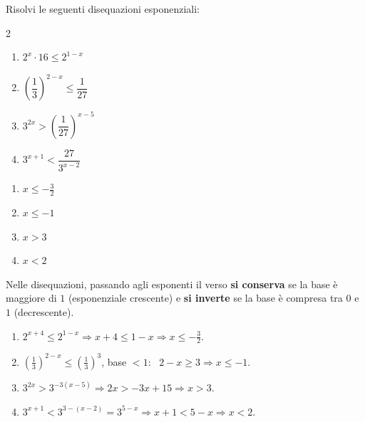 \begin{question}[ID=5.3, subtitle={Disequazioni con le proprietà delle potenze}, difficulty=media, tags={disequazioni, esponenziali, proprietà delle potenze}]
Risolvi le seguenti disequazioni esponenziali:
\begin{center}\begin{minipage}{0.92\linewidth}
\begin{multicols}{2}
\begin{enumerate}[leftmargin=3.2cm]
\item $2^{x} \cdot 16 \leq 2^{1-x}$
\item $\left(\dfrac{1}{3}\right)^{2-x} \leq \dfrac{1}{27}$
\item $3^{2x} > \left(\dfrac{1}{27}\right)^{x-5}$
\item $3^{x+1} < \dfrac{27}{3^{x-2}}$
\end{enumerate}
\end{multicols}
\end{minipage}\end{center}
\begin{solution}
\begin{enumerate}
    \item $x\leq-\tfrac32$
    \item $x\leq-1$
    \item $x>3$
    \item $x<2$
\end{enumerate}
\end{solution}
\begin{explanation}
Nelle disequazioni, passando agli esponenti il verso \textbf{si conserva} se la base è maggiore di $1$ (esponenziale crescente) e \textbf{si inverte} se la base è compresa tra $0$ e $1$ (decrescente).
\begin{enumerate}
    \item $2^{x+4}\leq2^{1-x} \Rightarrow x+4\leq1-x \Rightarrow x\leq-\tfrac32$.
    \item $\left(\tfrac13\right)^{2-x}\leq\left(\tfrac13\right)^3$, base $<1$: \ $2-x\geq3 \Rightarrow x\leq-1$.
    \item $3^{2x}>3^{-3(x-5)} \Rightarrow 2x>-3x+15 \Rightarrow x>3$.
    \item $3^{x+1}<3^{3-(x-2)}=3^{5-x} \Rightarrow x+1<5-x \Rightarrow x<2$.
\end{enumerate}
\end{explanation}
\end{question}


